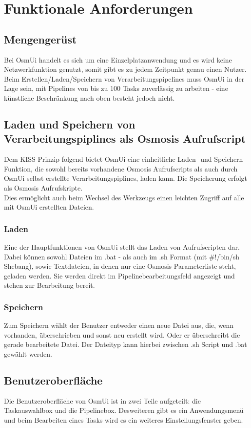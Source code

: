 \documentclass[a4paper,10pt]{scrartcl}
\begin{document}
\section{Funktionale Anforderungen}
\subsection{Mengengerüst}
Bei OsmUi handelt es sich um eine Einzelplatzanwendung und es wird keine Netzwerkfunktion genutzt, somit gibt es zu jedem Zeitpunkt genau einen Nutzer.\\
Beim Erstellen/Laden/Speichern von Verarbeitungspipelines muss OsmUi in der Lage sein, mit Pipelines von bis zu 100 Tasks zuverlässig zu arbeiten -
eine künstliche Beschränkung nach oben besteht jedoch nicht.
\subsection{Laden und Speichern von Verarbeitungspiplines als Osmosis Aufrufscript}
Dem KISS-Prinzip folgend bietet OsmUi eine einheitliche Laden- und Speichern-Funktion, die sowohl bereits vorhandene Osmosis Aufrufscripts als auch durch OsmUi
selbst erstellte Verarbeitungspiplines, laden kann. Die Speicherung erfolgt als Osmosis Aufrufskripte.\\
Dies ermöglicht auch beim Wechsel des Werkzeugs einen leichten Zugriff auf alle mit OsmUi erstellten Dateien.
\subsubsection{Laden}
Eine der Hauptfunktionen von OsmUi stellt das Laden von Aufrufscripten dar. Dabei können sowohl Dateien im .bat - als auch im .sh Format (mit \#!/bin/sh Shebang),
sowie Textdateien, in denen nur eine Osmosis Parameterliste steht, geladen werden. Sie werden direkt im Pipelinebearbeitungsfeld angezeigt und
stehen zur Bearbeitung bereit.
\subsubsection{Speichern}
Zum Speichern wählt der Benutzer entweder einen neue Datei aus, die, wenn vorhanden, überschrieben und sonst neu erstellt wird. Oder er überschreibt die gerade bearbeitete Datei.
Der Dateityp kann hierbei zwischen .sh Script und .bat gewählt werden.
\subsection{Benutzeroberfläche}
Die Benutzeroberfläche von OsmUi ist in zwei Teile aufgeteilt: die Taskauswahlbox und die Pipelinebox. Desweiteren gibt es ein Anwendungsmenü und beim Bearbeiten eines Tasks
wird es ein weiteres Einstellungsfenster geben.
\end{document}
